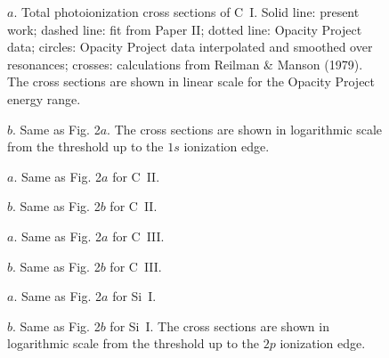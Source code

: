 {\setcounter{figure}{1}
\begin{figure}
\caption{$a$. Total photoionization cross sections of C~I. 
Solid line: present work;
dashed line: fit from Paper II; dotted line: Opacity Project data; circles: 
Opacity Project data interpolated and smoothed over resonances; crosses: 
calculations from Reilman \& Manson (1979). The cross sections are shown in 
linear scale for the Opacity Project energy range.}
\end{figure}

\setcounter{figure}{1}
\begin{figure}
\caption{$b$. Same as Fig. 2$a$. 
The cross sections are shown in 
logarithmic
scale from the threshold up to the $1s$ ionization edge.}
\end{figure}

\setcounter{figure}{2}
\begin{figure}
\caption{$a$. Same as Fig. 2$a$ for C~II.}
\end{figure}

\setcounter{figure}{2}
\begin{figure}
\caption{$b$. Same as Fig. 2$b$ for C~II.}
\end{figure}

\setcounter{figure}{3}
\begin{figure}
\caption{$a$. Same as Fig. 2$a$ for C~III.}
\end{figure}

\setcounter{figure}{3}
\begin{figure}
\caption{$b$. Same as Fig. 2$b$ for C~III.}
\end{figure}

\setcounter{figure}{4}
\begin{figure}
\caption{$a$. Same as Fig. 2$a$ for Si~I.}
\end{figure}

\setcounter{figure}{4}
\begin{figure}
\caption{$b$. Same as Fig. 2$b$ for Si~I. 
The cross sections are shown in 
logarithmic scale from 
the threshold up to the $2p$ ionization edge.}
\end{figure}

}

